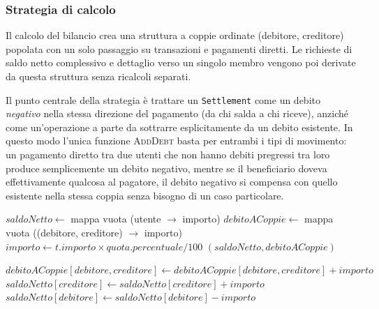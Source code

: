 \subsubsection{Strategia di calcolo}
Il calcolo del bilancio crea una struttura a coppie ordinate (debitore, creditore) popolata con un solo passaggio su transazioni e pagamenti diretti. Le richieste di saldo netto complessivo e dettaglio verso un singolo membro vengono poi derivate da questa struttura senza ricalcoli separati.

Il punto centrale della strategia è trattare un \texttt{Settlement} come un debito \emph{negativo} nella stessa direzione del pagamento (da chi salda a chi riceve), anziché come un'operazione a parte da sottrarre esplicitamente da un debito esistente. In questo modo l'unica funzione \textsc{AddDebt} basta per entrambi i tipi di movimento: un pagamento diretto tra due utenti che non hanno debiti pregressi tra loro produce semplicemente un debito negativo, mentre se il beneficiario doveva effettivamente qualcosa al pagatore, il debito negativo si compensa con quello esistente nella stessa coppia senza bisogno di un caso particolare.

\begin{algorithm}[H]
\caption{Costruzione del registro dei debiti (\texttt{BalanceCalculator.of})}
\label{alg:balance-ledger}
\begin{algorithmic}[1]
    \State $saldoNetto \gets$ mappa vuota (utente $\rightarrow$ importo)
    \State $debitoACoppie \gets$ mappa vuota ((debitore, creditore) $\rightarrow$ importo)
                \State $importo \gets t.importo \times quota.percentuale / 100$
                \State {}
            \EndIf
        \EndFor
    \EndFor
        \State {}
    \EndFor
    \State \Return $(saldoNetto, debitoACoppie)$
\EndProcedure

    \State $debitoACoppie[debitore, creditore] \gets debitoACoppie[debitore, creditore] + importo$
    \State $saldoNetto[creditore] \gets saldoNetto[creditore] + importo$
    \State $saldoNetto[debitore] \gets saldoNetto[debitore] - importo$
\EndProcedure
\end{algorithmic}
\end{algorithm}

